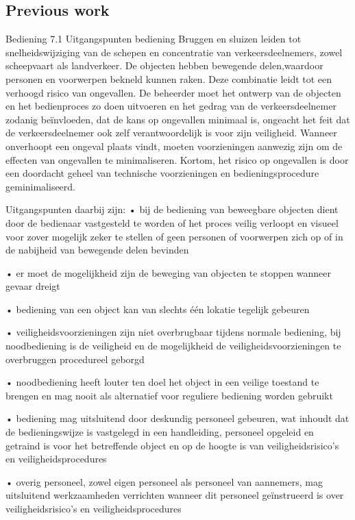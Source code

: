 \subsection{Previous work}


Bediening
7.1 Uitgangspunten bediening
Bruggen en sluizen leiden tot snelheidswijziging van de schepen en concentratie van verkeersdeelnemers, zowel scheepvaart als landverkeer. De objecten hebben bewegende delen,waardoor personen en voorwerpen bekneld kunnen raken. Deze combinatie leidt tot een
verhoogd risico van ongevallen. De beheerder moet het ontwerp van de objecten en het
bedienproces zo doen uitvoeren en het gedrag van de verkeersdeelnemer zodanig beïnvloeden, dat de kans op ongevallen minimaal is, ongeacht het feit dat de verkeersdeelnemer ook zelf verantwoordelijk is voor zijn veiligheid. Wanneer onverhoopt een ongeval plaats vindt, moeten voorzieningen aanwezig zijn om de effecten van ongevallen te minimaliseren. Kortom, het risico op ongevallen is door een doordacht geheel van technische voorzieningen en bedieningsprocedure geminimaliseerd. 

Uitgangspunten daarbij zijn:
• bij de bediening van beweegbare objecten dient door de bedienaar vastgesteld te worden of
het proces veilig verloopt en visueel voor zover mogelijk zeker te stellen of geen personen of
voorwerpen zich op of in de nabijheid van bewegende delen bevinden

• er moet de mogelijkheid zijn de beweging van objecten te stoppen wanneer gevaar dreigt

• bediening van een object kan van slechts één lokatie tegelijk gebeuren

• veiligheidsvoorzieningen zijn niet overbrugbaar tijdens normale bediening, bij noodbediening is de veiligheid en de mogelijkheid de veiligheidsvoorzieningen te overbruggen
procedureel geborgd

• noodbediening heeft louter ten doel het object in een veilige toestand te brengen en mag
nooit als alternatief voor reguliere bediening worden gebruikt

• bediening mag uitsluitend door deskundig personeel gebeuren, wat inhoudt dat de bedieningswijze is vastgelegd in een handleiding, personeel opgeleid en getraind is voor het
betreffende object en op de hoogte is van veiligheidsrisico’s en veiligheidsprocedures

• overig personeel, zowel eigen personeel als personeel van aannemers, mag uitsluitend
werkzaamheden verrichten wanneer dit personeel geïnstrueerd is over veiligheidsrisico’s en
veiligheidsprocedures

